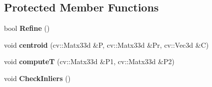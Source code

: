 \subsection*{Protected Member Functions}
\begin{DoxyCompactItemize}
\item 
bool {\bfseries Refine} ()\hypertarget{classMultiColSLAM_1_1cSim3Solver_aca681741e68a5a4ee4484cba712abbbd}{}\label{classMultiColSLAM_1_1cSim3Solver_aca681741e68a5a4ee4484cba712abbbd}

\item 
void {\bfseries centroid} (cv\+::\+Matx33d \&P, cv\+::\+Matx33d \&Pr, cv\+::\+Vec3d \&C)\hypertarget{classMultiColSLAM_1_1cSim3Solver_afa6b91282bbabb212135aad933021a1a}{}\label{classMultiColSLAM_1_1cSim3Solver_afa6b91282bbabb212135aad933021a1a}

\item 
void {\bfseries computeT} (cv\+::\+Matx33d \&P1, cv\+::\+Matx33d \&P2)\hypertarget{classMultiColSLAM_1_1cSim3Solver_a61b527a40ac6bdcf15c121885884c3b1}{}\label{classMultiColSLAM_1_1cSim3Solver_a61b527a40ac6bdcf15c121885884c3b1}

\item 
void {\bfseries Check\+Inliers} ()\hypertarget{classMultiColSLAM_1_1cSim3Solver_a41285a2ab1f57cf2dbded0fc69a55375}{}\label{classMultiColSLAM_1_1cSim3Solver_a41285a2ab1f57cf2dbded0fc69a55375}

\end{DoxyCompactItemize}
